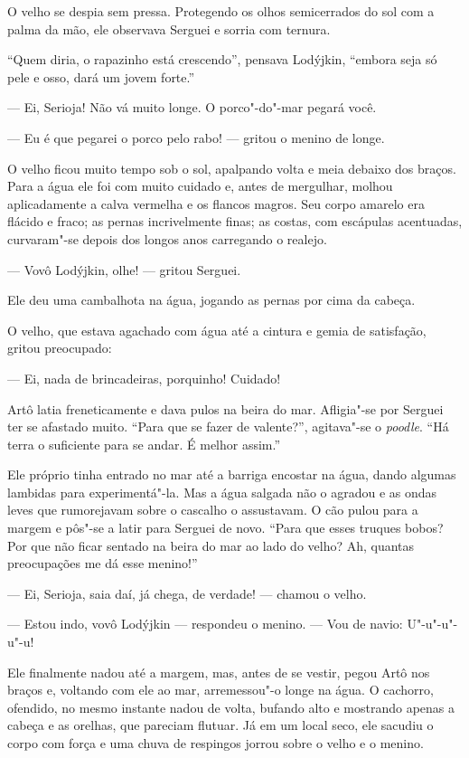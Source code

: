 O velho se despia sem pressa. Protegendo os olhos semicerrados do sol
com a palma da mão, ele observava Serguei e sorria com ternura.

``Quem diria, o rapazinho está crescendo'', pensava Lodýjkin, ``embora
seja só pele e osso, dará um jovem forte.''

--- Ei, Serioja! Não vá muito longe. O porco"-do"-mar pegará você.

--- Eu é que pegarei o porco pelo rabo! --- gritou o menino de longe.

O velho ficou muito tempo sob o sol, apalpando volta e meia debaixo dos
braços. Para a água ele foi com muito cuidado e, antes de mergulhar,
molhou aplicadamente a calva vermelha e os flancos magros. Seu corpo
amarelo era flácido e fraco; as pernas incrivelmente finas; as costas,
com escápulas acentuadas, curvaram"-se depois dos longos anos carregando
o realejo.

--- Vovô Lodýjkin, olhe! --- gritou Serguei.

Ele deu uma cambalhota na água, jogando as pernas por cima da cabeça.

O velho, que estava agachado com água até a cintura e gemia de
satisfação, gritou preocupado:

--- Ei, nada de brincadeiras, porquinho! Cuidado!

Artô latia freneticamente e dava pulos na beira do mar. Afligia"-se por
Serguei ter se afastado muito. ``Para que se fazer de valente?'',
agitava"-se o \emph{poodle}. ``Há terra o suficiente para se andar. É
melhor assim.''

Ele próprio tinha entrado no mar até a barriga encostar na água, dando
algumas lambidas para experimentá"-la. Mas a água salgada não o agradou e
as ondas leves que rumorejavam sobre o cascalho o assustavam. O cão
pulou para a margem e pôs"-se a latir para Serguei de novo. ``Para que
esses truques bobos? Por que não ficar sentado na beira do mar ao lado
do velho? Ah, quantas preocupações me dá esse menino!''

--- Ei, Serioja, saia daí, já chega, de verdade! --- chamou o velho.

--- Estou indo, vovô Lodýjkin --- respondeu o menino. --- Vou de navio:
U"-u"-u"-u"-u!

Ele finalmente nadou até a margem, mas, antes de se vestir, pegou Artô
nos braços e, voltando com ele ao mar, arremessou"-o longe na água. O
cachorro, ofendido, no mesmo instante nadou de volta, bufando alto e mostrando apenas a cabeça e
as orelhas, que pareciam flutuar. Já em um local
seco, ele sacudiu o corpo com força e uma chuva de respingos jorrou
sobre o velho e o menino.

